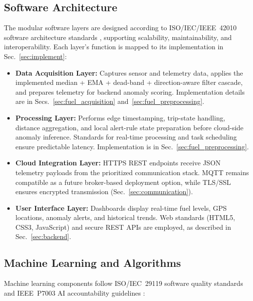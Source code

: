 \subsection{Software Architecture}  

The modular software layers are designed according to ISO/IEC/IEEE~42010 software architecture standards \cite{iso42010}, supporting scalability, maintainability, and interoperability. Each layer’s function is mapped to its implementation in Sec.~\ref{sec:implement}:

\begin{itemize}  
    \item \textbf{Data Acquisition Layer:} Captures sensor and telemetry data, applies the implemented median + EMA + dead-band + direction-aware filter cascade, and prepares telemetry for backend anomaly scoring. Implementation details are in Secs.~\ref{sec:fuel_acquisition} and~\ref{sec:fuel_preprocessing}.  

    \item \textbf{Processing Layer:} Performs edge timestamping, trip-state handling, distance aggregation, and local alert-rule state preparation before cloud-side anomaly inference. Standards for real-time processing and task scheduling ensure predictable latency. Implementation is in Sec.~\ref{sec:fuel_preprocessing}.  

    \item \textbf{Cloud Integration Layer:} HTTPS REST endpoints receive JSON telemetry payloads from the prioritized communication stack. MQTT remains compatible as a future broker-based deployment option, while TLS/SSL ensures encrypted transmission (Sec.~\ref{sec:communication}).  

    \item \textbf{User Interface Layer:} Dashboards display real-time fuel levels, GPS locations, anomaly alerts, and historical trends. Web standards (HTML5, CSS3, JavaScript) and secure REST APIs are employed, as described in Sec.~\ref{sec:backend}.  
\end{itemize}  

\subsection{Machine Learning and Algorithms}  

Machine learning components follow ISO/IEC~29119 software quality standards \cite{iso29119} and IEEE~P7003 AI accountability guidelines \cite{ieeep7003}:  

